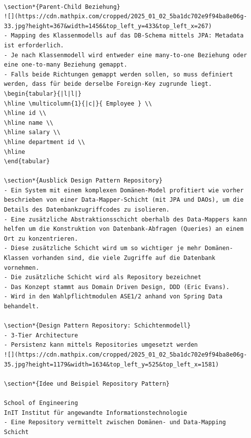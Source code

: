 \documentclass[10pt]{article}
\begin{document}
\begin{verbatim}

\section*{Parent-Child Beziehung}
![](https://cdn.mathpix.com/cropped/2025_01_02_5ba1dc702e9f94ba8e06g-33.jpg?height=367&width=1456&top_left_y=433&top_left_x=267)
- Mapping des Klassenmodells auf das DB-Schema mittels JPA: Metadata ist erforderlich.
- Je nach Klassenmodell wird entweder eine many-to-one Beziehung oder eine one-to-many Beziehung gemappt.
- Falls beide Richtungen gemappt werden sollen, so muss definiert werden, dass für beide derselbe Foreign-Key zugrunde liegt.
\begin{tabular}{|l|l|}
\hline \multicolumn{1}{|c|}{ Employee } \\
\hline id \\
\hline name \\
\hline salary \\
\hline department id \\
\hline
\end{tabular}

\section*{Ausblick Design Pattern Repository}
- Ein System mit einem komplexen Domänen-Model profitiert wie vorher beschrieben von einer Data-Mapper-Schicht (mit JPA und DAOs), um die Details des Datenbankzugriffcodes zu isolieren.
- Eine zusätzliche Abstraktionsschicht oberhalb des Data-Mappers kann helfen um die Konstruktion von Datenbank-Abfragen (Queries) an einem Ort zu konzentrieren.
- Diese zusätzliche Schicht wird um so wichtiger je mehr Domänen-Klassen vorhanden sind, die viele Zugriffe auf die Datenbank vornehmen.
- Die zusätzliche Schicht wird als Repository bezeichnet
- Das Konzept stammt aus Domain Driven Design, DDD (Eric Evans).
- Wird in den Wahlpflichtmodulen ASE1/2 anhand von Spring Data behandelt.

\section*{Design Pattern Repository: Schichtenmodell}
- 3-Tier Architecture
- Persistenz kann mittels Repositories umgesetzt werden
![](https://cdn.mathpix.com/cropped/2025_01_02_5ba1dc702e9f94ba8e06g-35.jpg?height=1179&width=1634&top_left_y=525&top_left_x=1581)

\section*{Idee und Beispiel Repository Pattern}

School of Engineering
InIT Institut für angewandte Informationstechnologie
- Eine Repository vermittelt zwischen Domänen- und Data-Mapping Schicht
\end{verbatim}
\end{document}
